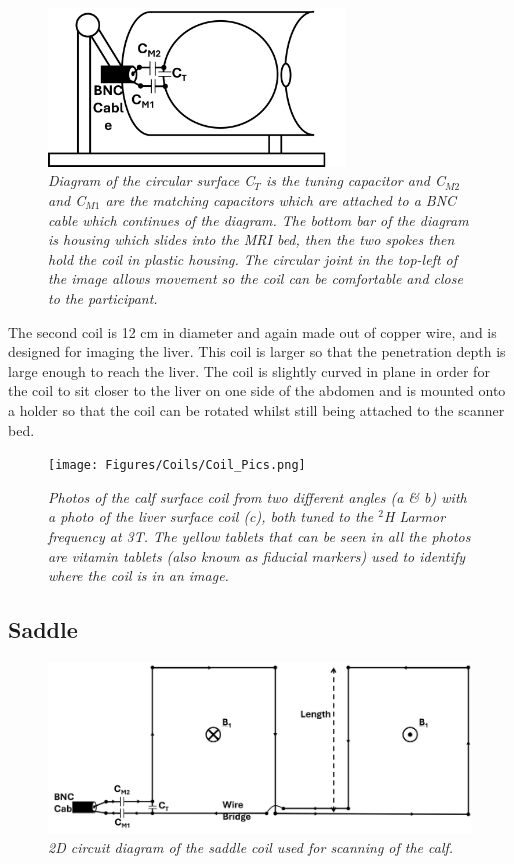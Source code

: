 \begin{figure}
    \centering
    \includegraphics[width=0.7\textwidth]{Figures/Coils/Liver_Coil.png}
    \caption{\textit{Diagram of the circular surface C$_T$ is the tuning capacitor and C$_{M2}$ and C$_{M1}$ are the matching capacitors which are attached to a BNC cable which continues of the diagram. The bottom bar of the diagram is housing which slides into the \ac{MRI} bed, then the two spokes then hold the coil in plastic housing. The circular joint in the top-left of the image allows movement so the coil can be comfortable and close to the participant.}}
    \label{fig:coils:Liver}
\end{figure}

The second coil is 12 cm in diameter and again made out of copper wire, and is designed for imaging the liver. This coil is larger so that the penetration depth is large enough to reach the liver. The coil is slightly curved in plane in order for the coil to sit closer to the liver on one side of the abdomen and is mounted onto a holder so that the coil can be rotated whilst still being attached to the scanner bed.

\begin{figure}
    \centering
    \texttt{[image: Figures/Coils/Coil\_Pics.png]}
    \caption{\textit{Photos of the calf surface coil from two different angles (a \& b) with a photo of the liver surface coil (c), both tuned to the $^2$H Larmor frequency at 3T. The yellow tablets that can be seen in all the photos are vitamin tablets (also known as fiducial markers) used to identify where the coil is in an image.}}
    \label{fig:coils:Pics}
\end{figure}

\subsection{Saddle}

\begin{figure}
    \centering
    \includegraphics[width=1\textwidth]{Figures/Coils/Planar_Saddle.png}
    \caption{\textit{2D circuit diagram of the saddle coil used for scanning of the calf.}}
    \label{fig:coils:2D_Saddle}
\end{figure}

